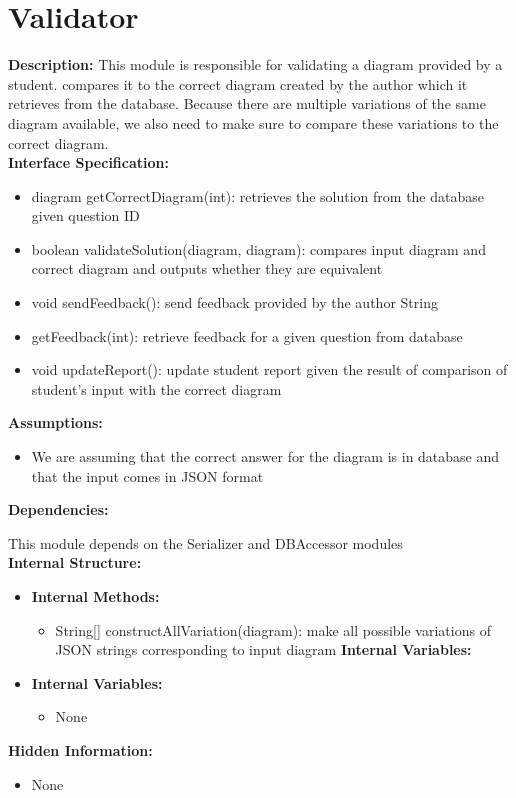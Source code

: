 \chapter{Validator}
\textbf{Description:}
This module is responsible for validating a diagram provided by a student. compares it to the correct diagram created by the author which it retrieves from the database. Because there are multiple variations of the same diagram available, we also need to make sure to compare these variations to the correct diagram. \\
\textbf{Interface Specification:}
    \begin{itemize}
            	\item diagram getCorrectDiagram(int): retrieves the solution from the database given question ID
            \item	boolean validateSolution(diagram, diagram): compares input diagram and correct diagram and outputs whether they are equivalent
    \item 	void sendFeedback(): send feedback provided by the author
    String\\
    \item getFeedback(int): retrieve feedback for a given question from database
    \item void updateReport(): update student report given the result of comparison of student’s input with the correct diagram
\end{itemize}
 \textbf{Assumptions:}
 \begin{itemize}
        \item 	We are assuming that the correct answer for the diagram is in database and that the input comes in JSON format
\end{itemize}
\textbf{Dependencies:}

        	This module depends on the Serializer and DBAccessor modules \\
\textbf{Internal Structure:}
\begin{itemize}
\item\textbf{Internal Methods:}
\begin{itemize}
    \item  String[] constructAllVariation(diagram): make all possible variations of JSON strings corresponding to input diagram
\textbf{Internal Variables:}
               \end{itemize}
\item\textbf{Internal Variables:}
\begin{itemize}
\item {None}
\end{itemize}
\end{itemize}
\textbf{Hidden Information:}
\begin{itemize}
\item {None}
\end{itemize}
        	
